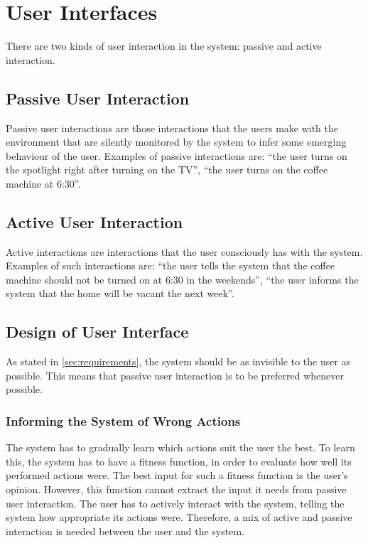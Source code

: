 \section{User Interfaces}\label{sec:userInterfaces}
There are two kinds of user interaction in the system: passive and active interaction.

\subsection{Passive User Interaction}
Passive user interactions are those interactions that the users make with the environment that are silently monitored by the system to infer some emerging behaviour of the user. Examples of passive interactions are: \enquote{the user turns on the spotlight right after turning on the TV}, \enquote{the user turns on the coffee machine at 6:30}.

\subsection{Active User Interaction}
Active interactions are interactions that the user consciously has with the system. Examples of such interactions are: \enquote{the user tells the system that the coffee machine should not be turned on at 6:30 in the weekends}, \enquote{the user informs the system that the home will be vacant the next week}.

\subsection{Design of User Interface}
As stated in \cref{sec:requirements}, the system should be as invisible to the user as possible. This means that passive user interaction is to be preferred whenever possible.

\subsubsection{Informing the System of Wrong Actions}
\label{subs:informingTheSystem}

The system has to gradually learn which actions suit the user the best. To learn this, the system has to have a fitness function, in order to evaluate how well its performed actions were. The best input for such a fitness function is the user's opinion. However, this function cannot extract the input it needs from passive user interaction. The user has to actively interact with the system, telling the system how appropriate its actions were. Therefore, a mix of active and passive interaction is needed between the user and the system.

